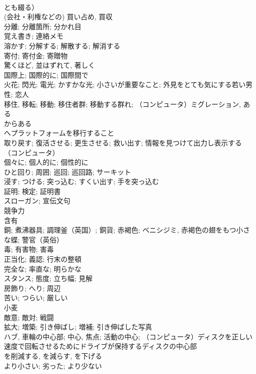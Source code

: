 \documentclass[8pt]{extreport}
\begin{document}
\begin{CJK}{UTF8}{min}
\\	とも綴る）	
\\	(会社・利権などの) 買い占め, 買収	
\\	分離; 分離箇所; 分かれ目	
\\	覚え書き; 連絡メモ	
\\	溶かす; 分解する; 解散する; 解消する	
\\	寄付; 寄付金; 寄贈物	
\\	驚くほど, 並はずれて, 著しく	
\\	国際上; 国際的に; 国際間で	
\\	火花; 閃光; 電光; かすかな光; 小さいが重要なこと; 外見をとても気にする若い男性; 恋人	
\\	移住, 移転; 移動; 移住者群; 移動する群れ; （コンピュータ）ミグレーション, ある
\\	からある
\\	へプラットフォームを移行すること	
\\	取り戻す; 復活させる; 更生させる; 救い出す; 情報を見つけて出力し表示する（コンピュータ）	
\\	個々に; 個人的に; 個性的に	
\\	ひと回り; 周囲; 巡回; 巡回路; サーキット	
\\	浸す; つける; 突っ込む; すくい出す; 手を突っ込む	
\\	証明; 検定; 証明書	
\\	スローガン; 宣伝文句	
\\	競争力	
\\	含有	
\\	銅; 煮沸器具; 調理釜（英国）; 銅貨; 赤褐色; ベニシジミ, 赤褐色の翅をもつ小さな蝶; 警官（英俗）	
\\	毒; 有害物; 害毒	
\\	正当化; 義認; 行末の整頓	
\\	完全な; 率直な; 明らかな	
\\	スタンス; 態度; 立ち幅; 見解	
\\	房飾り; へり; 周辺	
\\	苦い; つらい; 厳しい	
\\	小麦	
\\	敵意; 敵対; 戦闘	
\\	拡大; 増築; 引き伸ばし; 増補; 引き伸ばした写真	
\\	ハブ, 車輪の中心部; 中心, 焦点; 活動の中心; （コンピュータ）ディスクを正しい速度で回転させるためにドライブが保持するディスクの中心部	
\\	を削減する, を減らす, を下げる	
\\	より小さい; 劣った; より少ない	

\end{CJK}
\end{document}
